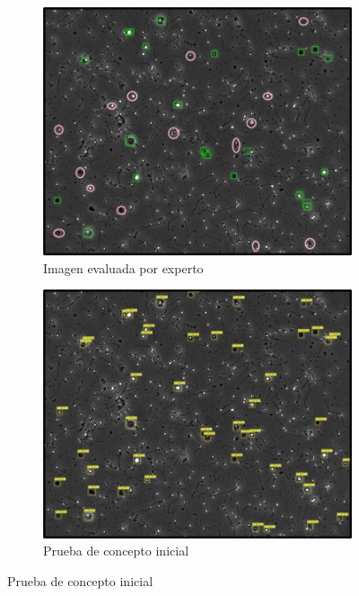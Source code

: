 \documentclass[12pt,a4paper,onecolumn,oneside]{report}
\begin{document}
\begin{figure}[H]
  \centering
  \begin{subfigure}[b]{0.48\textwidth}
    \centering
    \includegraphics[width=\textwidth]{figuras/evaluacion_cualitativa/461/461.jpg}
    \caption{Imagen evaluada por experto}
    \label{fig:exp_image_461}
  \end{subfigure}
  \hfill
  \begin{subfigure}[b]{0.48\textwidth}
    \centering
    \includegraphics[width=\textwidth]{figuras/evaluacion_cualitativa/461/461_v7.jpg}
    \caption{Prueba de concepto inicial}
    \label{fig:poc_image_461}
  \end{subfigure}
  

\end{figure}
\end{document}
